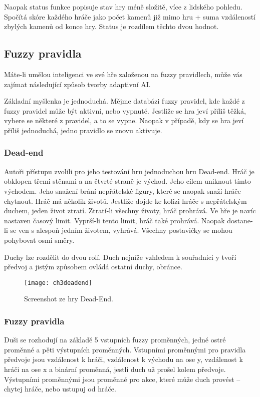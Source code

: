 Naopak status funkce popisuje stav hry méně složitě, více z lidského pohledu. Spočítá skóre každého hráče jako počet kamenů již mimo hru + suma vzdáleností zbylých kamenů od konce hry. Status je rozdílem těchto dvou hodnot.

\subsection{Fuzzy pravidla}

Máte-li umělou inteligenci ve své hře založenou na fuzzy pravidlech, může vás zajímat následující způsob tvorby adaptivní AI.

Základní myšlenka je jednoduchá. Mějme databázi fuzzy pravidel, kde každé z fuzzy pravidel může být aktivní, nebo vypnuté. Jestliže se hra jeví příliš těžká, vybere se některé z pravidel, a to se vypne. Naopak v případě, kdy se hra jeví příliš jednoduchá, jedno pravidlo se znovu aktivuje.

\subsubsection{Dead-end}

Autoři přístupu zvolili pro jeho testování hru jednoduchou hru Dead-end. Hráč je obklopen třemi stěnami a na čtvrté straně je východ. Jeho cílem uniknout tímto východem. Jeho snažení brání nepřátelské figury, které se naopak snaží hráče chytnout. Hráč má několik životů. Jestliže dojde ke kolizi hráče s nepřátelským duchem, jeden život ztratí. Ztratí-li všechny životy, hráč prohrává. Ve hře je navíc nastaven časový limit. Vyprší-li tento limit, hráč také prohrává. Naopak dostane-li se ven s alespoň jedním životem, vyhrává. Všechny postavičky se mohou pohybovat osmi směry.

Duchy lze rozdělit do dvou rolí. Duch nejníže vzhledem k souřadnici y tvoří předvoj a jistým způsobem ovládá ostatní duchy, obránce.

\begin{figure}
  \centering
  \texttt{[image: ch3deadend]}
	\caption{Screenshot ze hry Dead-End. \cite{25deadend} }
	\label{ch3deadend}
\end{figure}

\subsubsection{Fuzzy pravidla}

Duši se rozhodují na základě 5 vstupních fuzzy proměnných, jedné ostré proměnné a pěti výstupních proměnných.
Vstupními proměnnými pro pravidla předvoje jsou vzdálenost k hráči, vzdálenost k východu na ose y,  vzdálenost k hráči na ose x a binární proměnná, jestli duch už prošel kolem předvoje. Výstupními proměnnými jsou proměnné pro akce, které může duch provést – chytej hráče, nebo ustupuj od hráče.


